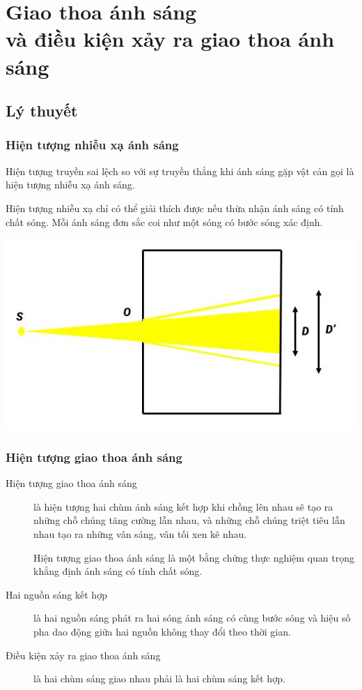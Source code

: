 
\chapter[Giao thoa ánh sáng và điều kiện xảy ra giao thoa ánh sáng]{Giao thoa ánh sáng \\và điều kiện xảy ra giao thoa ánh sáng}
\section{Lý thuyết}
\subsection{Hiện tượng nhiễu xạ ánh sáng}
Hiện tượng truyền sai lệch so với sự truyền thẳng khi ánh sáng gặp vật cản gọi là hiện tượng nhiễu xạ ánh sáng.

Hiện tượng nhiễu xạ chỉ có thể giải thích được nếu thừa nhận ánh sáng có tính chất sóng. Mỗi ánh sáng đơn sắc coi như một sóng có bước sóng xác định.
\begin{center}
	\includegraphics[scale=0.7]{../figs/VN12-PH-33-L-020-1-2.JPG}
\end{center}

\subsection{Hiện tượng giao thoa ánh sáng}
\begin{description}
	\item[Hiện tượng giao thoa ánh sáng] là hiện tượng hai chùm ánh sáng kết hợp khi chồng lên nhau sẽ tạo ra những chỗ chúng tăng cường lẫn nhau, và những chỗ chúng triệt tiêu lẫn nhau tạo ra những vân sáng, vân tối xen kẽ nhau. 
	
	Hiện tượng giao thoa ánh sáng là một bằng chứng thực nghiệm quan trọng khẳng định ánh sáng có tính chất sóng.
	\item[Hai nguồn sáng kết hợp] là hai nguồn sáng  phát ra hai sóng ánh sáng có cùng bước sóng và hiệu số pha dao động giữa hai nguồn không thay đổi theo thời gian.
	\item[Điều kiện xảy ra giao thoa ánh sáng] là hai chùm sáng giao nhau phải là hai chùm sáng kết hợp.
\end{description}



